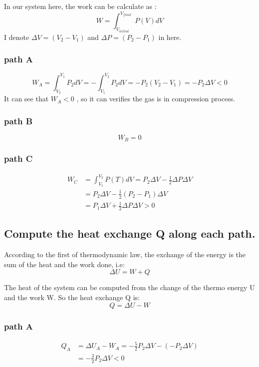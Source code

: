 \documentclass[a4paper,11pt]{article}
\begin{document}
In our system here, the work can be calculate as :
$$
W = \int_{V_{initial}}^{V_{final}} P(V)dV
$$
I denote $\Delta V = (V_2 -V_1)$ and $\Delta P = (P_2 -P_1)$  in here.

\subsubsection{path A}
$$
W_A = \int_{V_2}^{V_1} P_2 dV = -\int_{V_1}^{V_2} P_2 dV = -P_2(V_2 -V_1) = -P_2 \Delta V < 0
$$
It can see that $W_A < 0 $ , so it can verifies the gas is in  compression process. 

\subsubsection{path B}
$$
W_B = 0
$$

\subsubsection{path C}
\begin{align*}
W_C & = \int_{V_1}^{V_2} P(T) dV = P_2 \Delta V -\frac{1}{2} \Delta P\Delta V\\
& =  P_2 \Delta V -\frac{1}{2}(P_2- P_1)\Delta V
\\
& = P_1 \Delta V  + \frac{1}{2} \Delta P\Delta V > 0
\end{align*}



\subsection[1.4]{Compute the heat exchange Q along each path.}

According to the first of thermodynamic law, the exchange of the energy is the sum of the heat and the work done, i.e:
$$
\Delta U = W + Q
$$


The heat of the system can be computed from the change of the thermo energy U and the work W. So the heat exchange Q is:
$$
Q = \Delta U- W 
$$

\subsubsection{path A}
\begin{align*}
Q_A & = \Delta U_A- W_A=  - \frac{5}{2}P_2\Delta V   - (- P_2 \Delta V)
\\
& = - \frac{3}{2}P_2\Delta V < 0
\end{align*}
\end{document}
